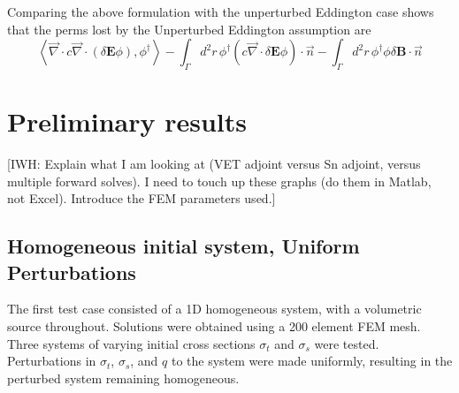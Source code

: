 \documentclass{article}
\newcommand{\bra}{\left\langle}
\newcommand{\ket}{\right\rangle}
\newcommand{\vdiv}{\vec{\nabla} \cdot}
\newcommand{\Edd}{\mathbf{E}}
\newcommand{\BEdd}{\mathbf{B}}
\newcommand{\sigt}{\sigma_t}
\newcommand{\sigs}{\sigma_s}
\newcommand{\isigt}{c}
\newcommand{\scalSource}{q}
\begin{document}
Comparing the above formulation with the unperturbed Eddington case shows that the perms lost by the Unperturbed Eddington assumption are 
\begin{equation}
\label{EddErr}
 \bra \vdiv \isigt \vdiv \left( \delta \Edd \phi \right), \phi^\dag \ket
- \int_\Gamma d^2 r \,  \phi^\dag \left( \isigt \vdiv \delta \Edd \phi \right) \cdot \vec{n}
- \int_\Gamma d^2 r \,  \phi^\dag \phi \delta \BEdd \cdot \vec{n}
\end{equation} 

\section{Preliminary results}

{\color{red}[IWH: Explain what I am looking at (VET adjoint versus Sn adjoint, versus multiple forward solves). I need to touch up these graphs (do them in Matlab, not Excel). Introduce the FEM parameters used.]}

\subsection{Homogeneous initial system, Uniform Perturbations}
The first test case consisted of a 1D homogeneous system, with a volumetric source throughout. Solutions were obtained using a 200 element FEM mesh. Three systems of varying initial cross sections $\sigt$ and $\sigs$ were tested. Perturbations in $\sigt$, $\sigs$, and $\scalSource$ to the system were made uniformly, resulting in the perturbed system remaining homogeneous.
\end{document}
